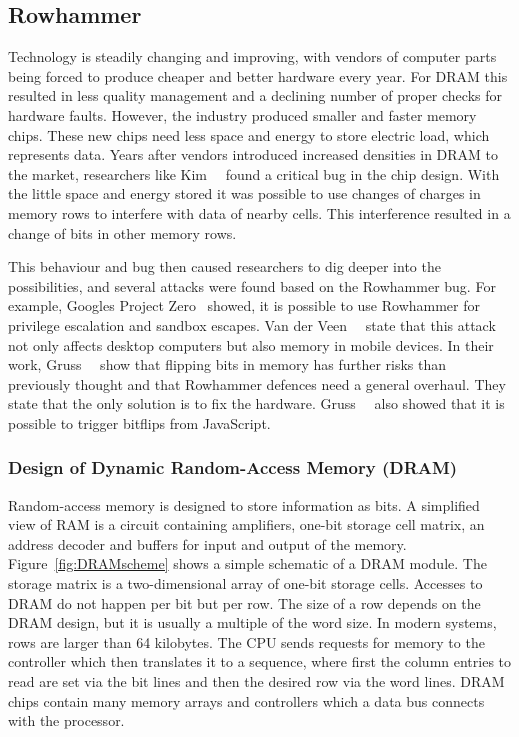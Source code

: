 \subsection{Rowhammer}

Technology is steadily changing and improving, with vendors of computer parts
being forced to produce cheaper and better hardware every year. For DRAM this
resulted in less quality management and a declining number of proper checks for
hardware faults. However, the industry produced smaller and faster memory chips.
These new chips need less space and energy to store electric load, which
represents data. Years after vendors introduced increased densities in DRAM to
the market, researchers like Kim~\etal~\cite{rowhammergeneral} found a critical
bug in the chip design. With the little space and energy stored it was possible
to use changes of charges in memory rows to interfere with data of nearby cells.
This interference resulted in a change of bits in other memory rows.

This behaviour and bug then caused researchers to dig deeper into the
possibilities, and several attacks were found based on the Rowhammer bug. For
example, Google\textquotesingle s \textquotedbl Project
Zero\textquotedbl~\cite{projectzerorow} showed,
it is possible to use Rowhammer for privilege escalation and sandbox escapes.
Van der Veen~\etal~\cite{drammer} state that this attack not only affects
desktop computers but also memory in mobile devices. In their work,
Gruss~\etal~\cite{flipinthewall} show that flipping bits in memory has further
risks than previously thought and that Rowhammer defences need a general
overhaul. They state that the only solution is to fix the hardware.
Gruss~\etal~\cite{rowhammerjs} also showed that it is possible to trigger
bitflips from JavaScript.

\subsubsection{Design of Dynamic Random-Access Memory (DRAM)}

Random-access memory is designed to store information as bits. A simplified view
of RAM is a circuit containing amplifiers, one-bit storage cell matrix, an
address decoder and buffers for input and output of the memory.
Figure~\ref{fig:DRAMscheme} shows a simple schematic of a DRAM module. The
storage matrix is a two-dimensional array of one-bit storage cells. Accesses to
DRAM do not happen per bit but per row. The size of a row depends on the DRAM
design, but it is usually a multiple of the word size. In modern systems, rows
are larger than 64 kilobytes. The CPU sends requests for memory to the
controller which then translates it to a sequence, where first the column
entries to read are set via the bit lines and then the desired row via the word
lines. DRAM chips contain many memory arrays and controllers which a data bus
connects with the processor.

